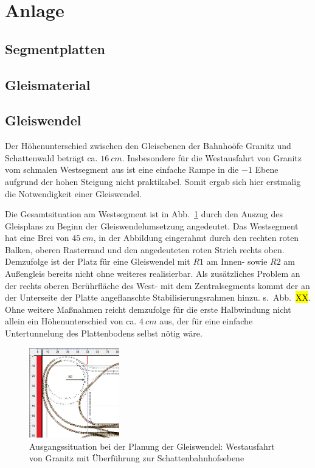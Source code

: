 \section{Anlage}
\label{sec:anlage}

\subsection{Segmentplatten}
\label{sec:segments}


\subsection{Gleismaterial}
\label{sec:trackMaterial}


\subsection{Gleiswendel}
\label{sec:trackHelix}

Der H\"ohenunterschied zwischen den Gleisebenen der Bahnho\"ofe Granitz und Schattenwald betr\"agt ca. $16~cm$.
Insbesondere f\"ur die Westausfahrt von Granitz vom schmalen Westsegment aus ist eine einfache Rampe in die $-1$ Ebene aufgrund der hohen Steigung nicht praktikabel.
Somit ergab sich hier erstmalig die Notwendigkeit einer Gleiswendel.

Die Gesamtsituation am Westsegment ist in Abb.~\ref{img:anlage_trackHelix_initialMapSituation} durch den Auszug des Gleisplans zu Beginn der Gleiswendelumsetzung angedeutet.
Das Westsegment hat eine Brei von $45~cm$, in der Abbildung eingerahmt durch den rechten roten Balken, oberen Rasterrand und den angedeuteten roten Strich rechts oben.
Demzufolge ist der Platz f\"ur eine Gleiswendel mit $R1$ am Innen- sowie $R2$ am Au{\ss}engleis bereits nicht ohne weiteres realisierbar.
Als zus\"atzliches Problem an der rechts oberen Ber\"uhrfl\"ache des West- mit dem Zentralsegments kommt der an der Unterseite der Platte angeflanschte Stabilisierungsrahmen hinzu. s.~Abb.~\hl{XX}.
Ohne weitere Ma{\ss}nahmen reicht demzufolge f\"ur die erste Halbwindung nicht allein ein H\"ohenunterschied von ca. $4~cm$ aus, der f\"ur eine einfache Untertunnelung des Plattenbodens selbst n\"otig w\"are.

\begin{figure}[h]
\centering
  \includegraphics[width=0.35\textwidth]{img/anlage/trackHelix_initialMapSituation.png}
	\caption{Ausgangssituation bei der Planung der Gleiswendel: Westausfahrt von Granitz mit \"Uberf\"uhrung zur Schattenbahnhofsebene}
	\label{img:anlage_trackHelix_initialMapSituation}
\end{figure}

